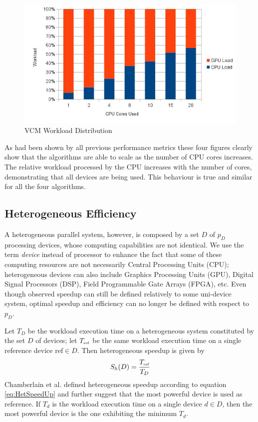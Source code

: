 \begin{figure}[H]
\centering
\includegraphics[width=0.8\linewidth]{img/vcmwl.jpg}
\caption{\label{img:vcmwl} VCM Workload Distribution}
\end{figure}

As had been shown by all previous performance metrics these four figures clearly show that the algorithms are able to scale as the number of CPU cores increases. The relative workload processed by the CPU increases with the number of cores, demonstrating that all devices are being used. This behaviour is true and similar for all the four algorithms.

\subsection{Heterogeneous Efficiency}

A heterogeneous parallel system, however, is composed by a set $D$ of $p_D$ processing devices, whose computing capabilities are not identical. We use the term {\em device} instead of processor to enhance the fact that some of these computing resources are not necessarily Central Processing Units (CPU); heterogeneous devices can also include Graphics Processing Units (GPU), Digital Signal Processors (DSP), Field Programmable Gate Arrays (FPGA), etc. Even though observed speedup can still be defined relatively to some uni-device system, optimal speedup and efficiency can no longer be defined with respect to $p_D$.

Let $T_D$ be the workload execution time on a heterogeneous system constituted by the set $D$ of devices; let $T_{\mbox{\tiny ref}}$ be the same workload execution time on a single reference device $\mbox{ref} \in D$. Then heterogeneous speedup is given by
\begin{equation}
S_h(D) = \frac{T_{\mbox{\tiny ref}}}{T_D}
\label{eq:HetSpeedUp}
\end{equation}
Chamberlain et al. \cite{Chamberlain98} defined heterogeneous speedup according to equation \ref{eq:HetSpeedUp} and further suggest that the most powerful device is used as reference. If $T_d$ is the workload execution time on a single device $d \in D$, then the most powerful device is the one exhibiting the minimum $T_d$.

